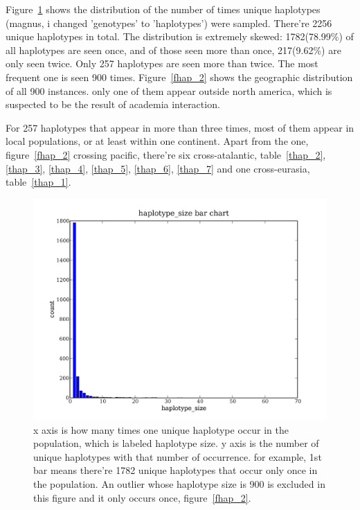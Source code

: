 \documentclass[a4paper,10pt]{article}
\begin{document}
Figure~\ref{fhap_1} shows the distribution of the number of times unique haplotypes (magnus, i changed 'genotypes' to 'haplotypes') were sampled. There're 2256 unique haplotypes in total. The distribution is extremely skewed: 1782(78.99\%) of all haplotypes are seen once, and of those seen more than once, 217(9.62\%) are only seen twice. Only 257 haplotypes are seen more than twice. The most frequent one is seen 900 times. Figure~\ref{fhap_2} shows the geographic distribution of all 900 instances. only one of them appear outside north america, which is suspected to be the result of academia interaction.

For 257 haplotypes that appear in more than three times, most of them appear in local populations, or at least within one continent. Apart from the one, figure~\ref{fhap_2} crossing pacific, there're six cross-atalantic, table~\ref{thap_2}, \ref{thap_3}, \ref{thap_4}, \ref{thap_5}, \ref{thap_6}, \ref{thap_7} and one cross-eurasia, table~\ref{thap_1}.




\begin{figure}
\includegraphics[width=1\textwidth]{figures/data_d110_c0_5_haplotype_size_bar_no_900.png}
\caption{x axis is how many times one unique haplotype occur in the population, which is labeled haplotype size. y axis is the number of unique haplotypes with that number of occurrence. for example, 1st bar means there're 1782 unique haplotypes that occur only once in the population. An outlier whose haplotype size is 900 is excluded in this figure and it only occurs once, figure~\ref{fhap_2}.}\label{fhap_1}
\end{figure}
\end{document}
